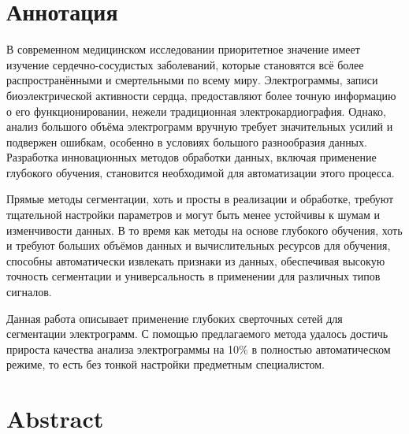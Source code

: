 \section*{Аннотация}

В современном медицинском исследовании приоритетное значение имеет изучение
сердечно-сосудистых заболеваний, которые становятся всё более распространёнными
и смертельными по всему миру. Электрограммы, записи биоэлектрической активности
сердца, предоставляют более точную информацию о его функционировании, нежели
традиционная электрокардиография. Однако, анализ большого объёма электрограмм
вручную требует значительных усилий и подвержен ошибкам, особенно в условиях
большого разнообразия данных. Разработка инновационных методов обработки данных,
включая применение глубокого обучения, становится необходимой для автоматизации
этого процесса.

Прямые методы сегментации, хоть и просты в реализации и обработке, требуют
тщательной настройки параметров и могут быть менее устойчивы к шумам и
изменчивости данных. В то время как методы на основе глубокого обучения, хоть и
требуют больших объёмов данных и вычислительных ресурсов для обучения, способны
автоматически извлекать признаки из данных, обеспечивая высокую точность
сегментации и универсальность в применении для различных типов сигналов.

Данная работа описывает применение глубоких сверточных сетей для сегментации
электрограмм. С помощью предлагаемого метода удалось достичь прироста качества
анализа электрограммы на 10\% в полностью автоматическом режиме, то есть без
тонкой настройки предметным специалистом.

\section*{Abstract}
